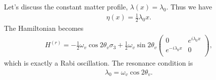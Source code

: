 \documentclass[letterpaper,12pt,english]{sphinxmanual}
\begin{document}
Let's discuss the constant matter profile, \(\lambda(x) = \lambda_0\). Thus we have
\begin{equation*}
\begin{split}\eta(x) = \frac{1}{2} \lambda_0 x.\end{split}
\end{equation*}
The Hamiltonian becomes
\begin{equation*}
\begin{split}H^{(r)} = - \frac{1}{2}\omega_v \cos 2\theta_v \sigma_3 + \frac{1}{2} \omega_v \sin 2\theta_v \begin{pmatrix}
0 & e^{i\lambda_0 x} \\
e^{-i\lambda_0 x} & 0 \\
\end{pmatrix},\end{split}
\end{equation*}
which is exactly a Rabi oscillation. The resonance condition is
\begin{equation*}
\begin{split}\lambda_0 = \omega_v \cos 2\theta_v.\end{split}
\end{equation*}
\end{document}
